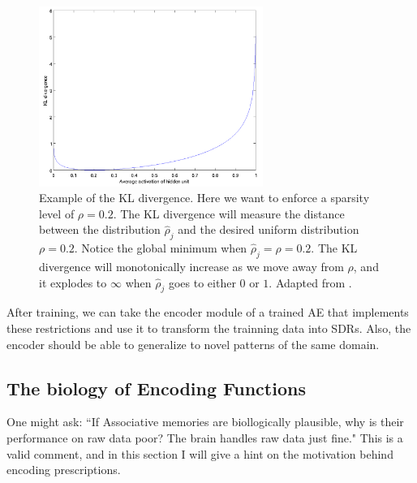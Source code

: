 \documentclass[runningheads]{llncs}
\begin{document}
\begin{figure}[h]
    \centering
    \includegraphics[width=0.65\textwidth]{img/KL.PNG}
    \caption{Example of the KL divergence. Here we want to enforce a sparsity level of $\rho = 0.2$. The KL divergence will measure the distance between the distribution $\hat\rho_j$ and the desired uniform distribution $\rho = 0.2$. Notice the global minimum when $\hat\rho_j = \rho = 0.2 $. The KL divergence will monotonically increase as we move away from $\rho$, and it explodes to $\infty$ when $\hat\rho_j$ goes to either $0$ or $1$. Adapted from \cite{ng2011sparse}.}
\label{fig:KL}
\end{figure}

After training, we can take the encoder module of a trained AE that implements these restrictions and use it to transform the trainning data into SDRs. Also, the encoder should be able to generalize to novel patterns of the same domain.

\subsection{The biology of Encoding Functions}
\label{sec:prescriptions_bio}
One might ask: ``If Associative memories are biollogically plausible, why is their performance on raw data poor? The brain handles raw data just fine." This is a valid comment, and in this section I will give a hint on the motivation behind encoding prescriptions.
\end{document}
